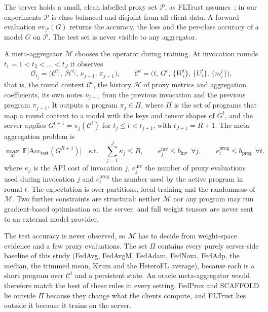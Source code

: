 \documentclass[3p,times,a4paper]{elsarticle}
\newcommand{\binv}{b_{\mathrm{inv}}}
\newcommand{\bprog}{b_{\mathrm{prog}}}
\begin{document}
The server holds a small, clean labelled proxy set $\mathcal{P}$, as FLTrust assumes~\cite{cao2021fltrust}; in our experiments $\mathcal{P}$ is class-balanced and disjoint from all client data. A forward evaluation $\mathrm{ev}_{\mathcal{P}}(G)$ returns the accuracy, the loss and the per-class accuracy of a model $G$ on $\mathcal{P}$. The test set is never visible to any aggregator.

A meta-aggregator $\mathcal{M}$ chooses the operator during training. At invocation rounds $t_1=1<t_2<\dots<t_J$ it observes
\begin{equation}
  \mathcal{O}_{t_j}=\big(\mathcal{C}^{t_j},\,\mathcal{H}^{t_j},\,\nu_{j-1},\,\pi_{j-1}\big),\qquad
  \mathcal{C}^{t}=\big(t,\,G^t,\,\{W_i^t\},\,\{U_i^t\},\,\{m_i^t\}\big),
\end{equation}
that is, the round context $\mathcal{C}^t$, the history $\mathcal{H}$ of proxy metrics and aggregation coefficients, its own notes $\nu_{j-1}$ from the previous invocation and the previous program $\pi_{j-1}$. It outputs a program $\pi_j\in\Pi$, where $\Pi$ is the set of programs that map a round context to a model with the keys and tensor shapes of $G^t$, and the server applies $G^{t+1}=\pi_j(\mathcal{C}^t)$ for $t_j\le t<t_{j+1}$, with $t_{J+1}=R+1$. The meta-aggregation problem is
\begin{equation}
  \max_{\mathcal{M}}\ \mathbb{E}\big[\mathrm{Acc}_{\mathrm{test}}(G^{R+1})\big]
  \quad\text{s.t.}\quad
  \sum_{j=1}^{J}\kappa_j\le B,\qquad
  e_j^{\mathrm{inv}}\le\binv\ \ \forall j,\qquad
  e_t^{\mathrm{prog}}\le\bprog\ \ \forall t,
  \label{eq:meta}
\end{equation}
where $\kappa_j$ is the API cost of invocation $j$, $e_j^{\mathrm{inv}}$ the number of proxy evaluations used during invocation $j$ and $e_t^{\mathrm{prog}}$ the number used by the active program in round $t$. The expectation is over partitions, local training and the randomness of $\mathcal{M}$. Two further constraints are structural: neither $\mathcal{M}$ nor any program may run gradient-based optimisation on the server, and full weight tensors are never sent to an external model provider.

The test accuracy is never observed, so $\mathcal{M}$ has to decide from weight-space evidence and a few proxy evaluations. The set $\Pi$ contains every purely server-side baseline of this study (FedAvg, FedAvgM, FedAdam, FedNova, FedAdp, the median, the trimmed mean, Krum and the HeteroFL average), because each is a short program over $\mathcal{C}^t$ and a persistent state. An oracle meta-aggregator would therefore match the best of these rules in every setting. FedProx and SCAFFOLD lie outside $\Pi$ because they change what the clients compute, and FLTrust lies outside it because it trains on the server.
\end{document}
